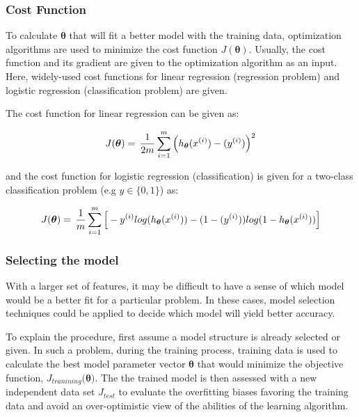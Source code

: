 \subsubsection{Cost Function}

To calculate $\bm{\theta}$ that will fit a better model with the training data, optimization algorithms are used to minimize the cost function $J({\bm{\theta}})$.
Usually, the cost function and its gradient are given to the optimization algorithm as an input. 
Here, widely-used cost functions for linear regression (regression problem) and logistic regression (classification problem) are given. 

The cost function for linear regression can be given as:

\begin{equation}{\label{eqn:costFuncLinearRegression}}
J({\bm{\theta}})
=\,
\frac{1}{2m} \sum\limits_{i=1}^{m} \Big(h_{\bm{\theta}}(x^{(i)}) - (y^{(i)})\Big)^2  
\end{equation} 

and the cost function for logistic regression (classification) is given for a two-class classification problem (e.g $y \in \{0,1\}$) as:

\begin{equation}{\label{eqn:costFuncLogisticRegression}}
J({\bm{\theta}})
=\,
\frac{1}{m} \sum\limits_{i=1}^{m} \Big[-y^{(i)}log(h_{\bm{\theta}}(x^{(i)})) - (1-(y^{(i)}))log(1-h_{\bm{\theta}}(x^{(i)}))\Big]
\end{equation} 


\subsubsection{Selecting the model}

With a larger set of features, it may be difficult to have a sense of which model would be a better fit for a particular problem. 
In these cases, model selection techniques could be applied to decide which model will yield better accuracy.

To explain the procedure, first assume a model structure is already selected or given. 
In such a problem, during the training process, training data is used to calculate the best model parameter vector $\bm{\theta}$ that would minimize the objective function, $J_{tranining}(\bm{\theta)}$.
The the trained model is then assessed with a new independent data set $J_{test}$ to evaluate the overfitting biases favoring the training data and avoid an over-optimistic view of the abilities of the learning algorithm. 

